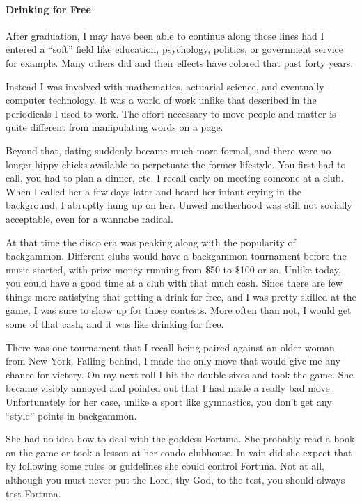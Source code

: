 \paragraph{Drinking for Free}

After graduation, I may have been able to continue along those lines had I entered a ``soft'' field like education, psychology, politics, or government service for example. Many others did and their effects have colored that past forty years.

Instead I was involved with mathematics, actuarial science, and eventually computer technology. It was a world of work unlike that described in the periodicals I used to work. The effort necessary to move people and matter is quite different from manipulating words on a page.

Beyond that, dating suddenly became much more formal, and there were no longer hippy chicks available to perpetuate the former lifestyle. You first had to call, you had to plan a dinner, etc. I recall early on meeting someone at a club. When I called her a few days later and heard her infant crying in the background, I abruptly hung up on her. Unwed motherhood was still not socially acceptable, even for a wannabe radical.

At that time the disco era was peaking along with the popularity of backgammon. Different clubs would have a backgammon tournament before the music started, with prize money running from \$50 to \$100 or so. Unlike today, you could have a good time at a club with that much cash. Since there are few things more satisfying that getting a drink for free, and I was pretty skilled at the game, I was sure to show up for those contests. More often than not, I would get some of that cash, and it was like drinking for free.

There was one tournament that I recall being paired against an older woman from New York. Falling behind, I made the only move that would give me any chance for victory. On my next roll I hit the double-sixes and took the game. She became visibly annoyed and pointed out that I had made a really bad move. Unfortunately for her case, unlike a sport like gymnastics, you don't get any ``style'' points in backgammon.

She had no idea how to deal with the goddess Fortuna. She probably read a book on the game or took a lesson at her condo clubhouse. In vain did she expect that by following some rules or guidelines she could control Fortuna. Not at all, although you must never put the Lord, thy God, to the test, you should always test Fortuna.

